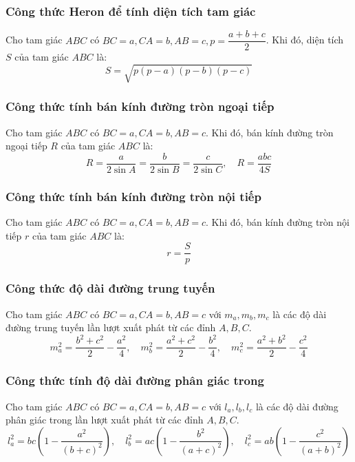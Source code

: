 \documentclass[12pt,a4paper]{extarticle}
\begin{document}
\subsubsection*{\textcolor{bookmagenta}{Công thức Heron để tính diện tích tam giác}}
\begin{formulaBox}
Cho tam giác $ABC$ có $BC = a, CA = b, AB = c, p = \dfrac{a+b+c}{2}$. Khi đó, diện tích $S$ của tam giác $ABC$ là:
\[
S = \sqrt{p(p-a)(p-b)(p-c)}
\]
\end{formulaBox}
\subsubsection*{\textcolor{bookmagenta}{Công thức tính bán kính đường tròn ngoại tiếp}}
\begin{formulaBox}
Cho tam giác $ABC$ có $BC = a, CA = b, AB = c$. Khi đó, bán kính đường tròn ngoại tiếp $R$ của tam giác $ABC$ là:
\[
R = \frac{a}{2\sin A} = \frac{b}{2\sin B} = \frac{c}{2\sin C}, \quad R = \frac{abc}{4S}
\]
\end{formulaBox}
\subsubsection*{\textcolor{bookmagenta}{Công thức tính bán kính đường tròn nội tiếp}}
\begin{formulaBox}
Cho tam giác $ABC$ có $BC = a, CA = b, AB = c$. Khi đó, bán kính đường tròn nội tiếp $r$ của tam giác $ABC$ là:
\[
r = \frac{S}{p}
\]
\end{formulaBox}
\subsubsection*{\textcolor{bookmagenta}{Công thức độ dài đường trung tuyến}}
\begin{formulaBox}
Cho tam giác $ABC$ có $BC = a, CA = b, AB = c$ với $m_a, m_b, m_c$ là các độ dài đường trung tuyến lần lượt xuất phát từ các đỉnh $A, B, C$.
\[
m_a^2 = \frac{b^2+c^2}{2} - \frac{a^2}{4}, \quad m_b^2 = \frac{a^2+c^2}{2} - \frac{b^2}{4}, \quad m_c^2 = \frac{a^2+b^2}{2} - \frac{c^2}{4}
\]
\end{formulaBox}
\subsubsection*{\textcolor{bookmagenta}{Công thức tính độ dài đường phân giác trong}}
\begin{formulaBox}
Cho tam giác $ABC$ có $BC = a, CA = b, AB = c$ với $l_a, l_b, l_c$ là các độ dài đường phân giác trong lần lượt xuất phát từ các đỉnh $A, B, C$.
\[
l_a^2 = bc \left( 1 - \frac{a^2}{(b+c)^2} \right), \quad l_b^2 = ac \left( 1 - \frac{b^2}{(a+c)^2} \right), \quad l_c^2 = ab \left( 1 - \frac{c^2}{(a+b)^2} \right)
\]
\end{formulaBox}
\end{document}
